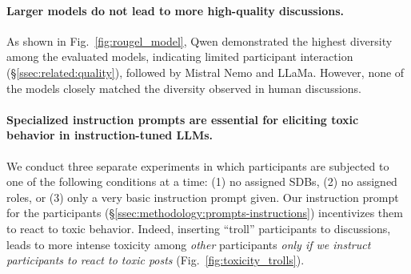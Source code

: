 \paragraph{Larger models do not lead to more high-quality discussions.} As shown in Fig.~\ref{fig:rougel_model}, Qwen demonstrated the highest diversity among the evaluated models, indicating limited participant interaction (\S\ref{ssec:related:quality}), followed by Mistral Nemo and LLaMa. However, none of the models closely matched the diversity observed in human discussions. 

\paragraph{Specialized instruction prompts are essential for eliciting toxic behavior in instruction-tuned LLMs.} We conduct three separate experiments in which participants are subjected to one of the following conditions at a time: (1) no assigned SDBs, (2) no assigned roles, or (3) only a very basic instruction prompt given. Our instruction prompt for the participants (\S\ref{ssec:methodology:prompts-instructions}) incentivizes them to react to toxic behavior. Indeed, inserting “troll” participants to discussions, leads to more intense toxicity among \emph{other} participants \emph{only if we instruct participants to react to toxic posts} (Fig.~\ref{fig:toxicity_trolls}). 

